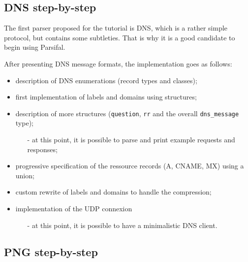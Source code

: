 \documentclass{article}
\begin{document}
\subsection{DNS step-by-step}

The first parser proposed for the tutorial is DNS, which is a rather
simple protocol, but contains some subtleties. That is why it is a
good candidate to begin using Parsifal.

After presenting DNS message formats, the implementation goes as
follows:
\begin{itemize}
\item description of DNS enumerations (record types and classes);
\item first implementation of labels and domains using structures;
\item description of more structures (\texttt{question}, \texttt{rr}
  and the overall \texttt{dns\_message} type);
\begin{itemize}
\item[-] at this point, it is possible to parse and print example
  requests and responses;
\end{itemize}
\item progressive specification of the ressource records (A, CNAME,
  MX) using a union;
\item custom rewrite of labels and domains to handle the compression;
\item implementation of the UDP connexion
\begin{itemize}
\item[-] at this point, it is possible to have a minimalistic DNS client.
\end{itemize}
\end{itemize}


\subsection{PNG step-by-step}
\end{document}
